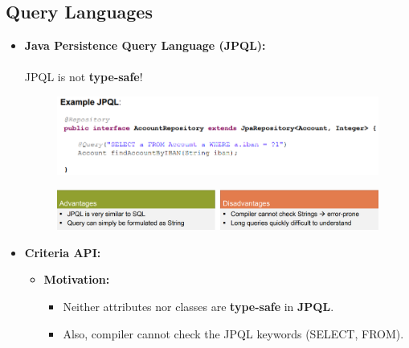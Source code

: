 \documentclass[ieeetran]{article}
\begin{document}
\subsection{Query Languages} %
\label{sub:query_languages}
\begin{itemize}
  \item \textbf{Java Persistence Query Language (JPQL):}
	  \\ \\JPQL is not \textbf{type-safe}!
	  \begin{figure}[h!]
	    \centering
	    \includegraphics[width=0.7\linewidth]{examplejpql.png}
	    \label{fig:examplejpql_png}
	  \end{figure}

	  \begin{figure}[h!]
	    \centering
	    \includegraphics[width=0.7\linewidth]{addisjpql.png}
	    \label{fig:addisjpql_png}
	  \end{figure}


\item \textbf{Criteria API:}
\begin{itemize}
  \item \textbf{Motivation:}
\begin{itemize}
	  \item Neither attributes nor classes are \textbf{type-safe} in \textbf{JPQL}.
	\item Also, compiler cannot check the JPQL keywords (SELECT, FROM). 
	\end{itemize}


\end{itemize}
\end{itemize}
\end{document}
